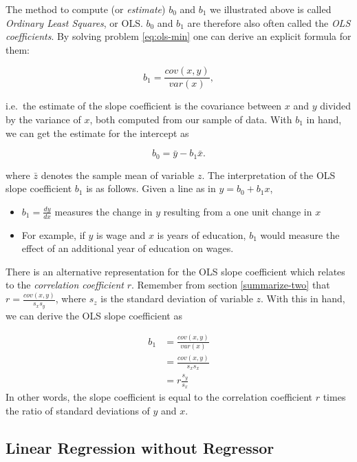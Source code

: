 \documentclass[]{book}
\providecommand{\tightlist}{%
  \setlength{\itemsep}{0pt}\setlength{\parskip}{0pt}}
\begin{document}
The method to compute (or \emph{estimate}) \(b_0\) and \(b_1\) we illustrated above is called \emph{Ordinary Least Squares}, or OLS. \(b_0\) and \(b_1\) are therefore also often called the \emph{OLS coefficients}. By solving problem \eqref{eq:ols-min} one can derive an explicit formula for them:

\begin{equation}
b_1 = \frac{cov(x,y)}{var(x)},  \label{eq:beta1hat}
\end{equation}

i.e.~the estimate of the slope coefficient is the covariance between \(x\) and \(y\) divided by the variance of \(x\), both computed from our sample of data. With \(b_1\) in hand, we can get the estimate for the intercept as

\begin{equation}
b_0 = \bar{y} - b_1 \bar{x}.  \label{eq:beta0hat}
\end{equation}

where \(\bar{z}\) denotes the sample mean of variable \(z\). The interpretation of the OLS slope coefficient \(b_1\) is as follows. Given a line as in \(y = b_0 + b_1 x\),

\begin{itemize}
\tightlist
\item
  \(b_1 = \frac{d y}{d x}\) measures the change in \(y\) resulting from a one unit change in \(x\)
\item
  For example, if \(y\) is wage and \(x\) is years of education, \(b_1\) would measure the effect of an additional year of education on wages.
\end{itemize}

There is an alternative representation for the OLS slope coefficient which relates to the \emph{correlation coefficient} \(r\). Remember from section \ref{summarize-two} that \(r = \frac{cov(x,y)}{s_x s_y}\), where \(s_z\) is the standard deviation of variable \(z\). With this in hand, we can derive the OLS slope coefficient as

\begin{align}
b_1 &= \frac{cov(x,y)}{var(x)}\\
    &= \frac{cov(x,y)}{s_x s_x} \\
    &= r\frac{s_y}{s_x} \label{eq:beta1-r}
\end{align}
In other words, the slope coefficient is equal to the correlation coefficient \(r\) times the ratio of standard deviations of \(y\) and \(x\).

\hypertarget{linear-regression-without-regressor}{%
\subsection{Linear Regression without Regressor}\label{linear-regression-without-regressor}}
\end{document}
